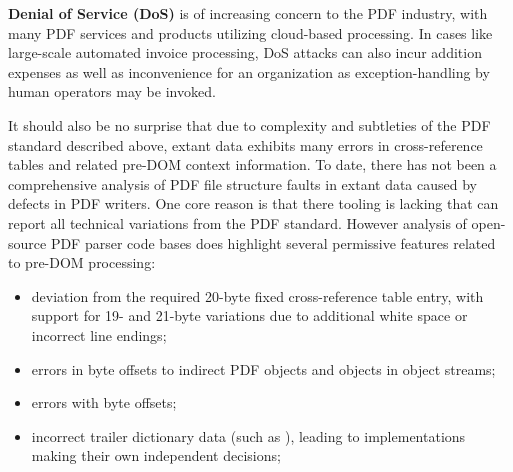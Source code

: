 {\bf{Denial of Service (DoS)}} is of increasing concern to the PDF industry, with many PDF services
and products utilizing cloud-based processing. In cases like large-scale automated invoice 
processing, DoS attacks can also incur addition expenses as well as inconvenience for an organization 
as exception-handling by human operators may be invoked.  

It should also be no surprise that due to complexity and subtleties of the PDF standard described above,
extant data exhibits many errors in cross-reference tables and related pre-DOM context information.
To date, there has not been a comprehensive analysis of PDF file structure faults in extant data
caused by defects in PDF writers. One core reason is that there tooling is lacking that can report
all technical variations from the PDF standard. However analysis of open-source PDF parser code bases
does highlight several permissive features related to pre-DOM processing:

\begin{itemize}
    \item deviation from the required 20-byte fixed cross-reference table entry, with support for
    19- and 21-byte variations due to additional white space or incorrect line endings;
    \item errors in byte offsets to indirect PDF objects and objects in object streams;
    \item errors with  byte offsets;
    \item incorrect trailer dictionary data (such as ), leading to implementations 
    making their own independent decisions;  
\end{itemize}
